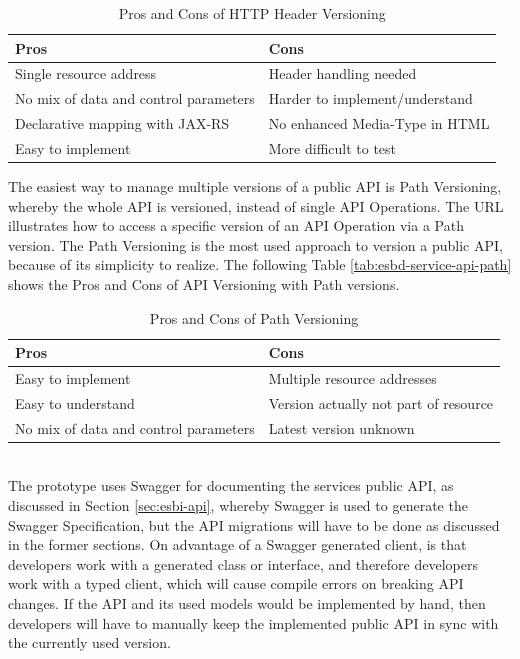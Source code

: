 {\renewcommand{\arraystretch}{1.2}%
\begin{table}[h]
	\begin{tabularx}{\textwidth}{ X|X }	
		\textbf{Pros}                         & \textbf{Cons}    \\  \hline
		Single resource address               & Header handling needed     \\  
		No mix of data and control parameters & Harder to implement/understand     \\
		Declarative mapping with JAX-RS       & No enhanced Media-Type in HTML     \\
		Easy to implement                     & More difficult to test \\ \hline
	\end{tabularx}
	\caption{Pros and Cons of HTTP Header Versioning}
	\label{tab:esbd-service-api-http-header}
\end{table}}

The easiest way to manage multiple versions of a public API is Path Versioning, whereby the whole API is versioned, instead of single API Operations. The URL  illustrates how to access a specific version of an API Operation via a Path version. The Path Versioning is the most used approach to version a public API, because of its simplicity to realize.  The following Table \vref{tab:esbd-service-api-path} shows the Pros and Cons of API Versioning with Path versions.

{\renewcommand{\arraystretch}{1.2}%
	\begin{table}[h]
		\begin{tabularx}{\textwidth}{ X|X }	
			\textbf{Pros}                         & \textbf{Cons}    \\  \hline
			Easy to implement                     & Multiple resource addresses      \\
			Easy to understand                    & Version actually not part of resource     \\  
			No mix of data and control parameters & Latest version unknown \\ \hline
		\end{tabularx}
		\caption{Pros and Cons of Path Versioning}
		\label{tab:esbd-service-api-path}
\end{table}}
\ \\
The prototype uses Swagger for documenting the services public API, as discussed in Section \vref{sec:esbi-api}, whereby Swagger is used to generate the Swagger Specification, but the API migrations will have to be done as discussed in the former sections. On advantage of a Swagger generated client, is that developers work with a generated class or interface, and therefore developers work with a typed client, which will cause compile errors on breaking API changes. If the API and its used models would be implemented by hand, then developers will have to manually keep the implemented public API in sync with the currently used version.


